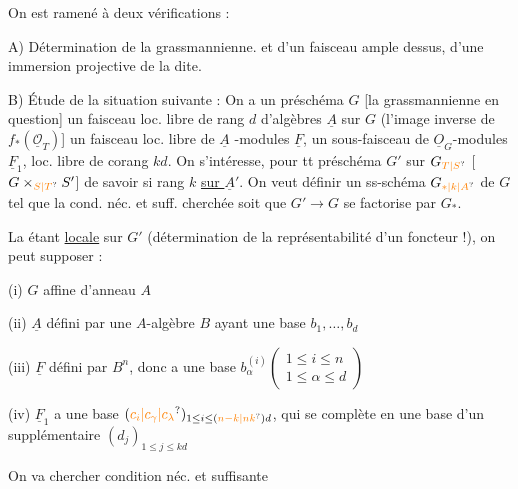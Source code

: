 

On est ramené  à deux vérifications :

A) Détermination de la grassmannienne. et d'un faisceau ample dessus,  d'une immersion projective de la dite.


B) Étude de la situation suivante : On a un préschéma $G$ [la grassmannienne en question] un faisceau loc. libre de rang $d$ d'algèbres $\underline A$ sur $G$ (l'image inverse de $f_*(\underline{\mathcal O}_T)$] un faisceau loc. libre de $\underline A$ -modules $\underline F$, un sous-faisceau de $\underline O_G$-modules $\underline F_1$,  loc. libre de corang $kd$. On s'intéresse, pour tt préschéma $G'$ sur $G_{\unsure{T|S}}$ [ $G\times_{\unsure{S|T}} S'$] de savoir si   rang $k$ \uline{sur $\underline A'$}. On veut définir un ss-schéma  $G_{\unsure{\ast|k|A}}$ de $G$ tel que la cond. néc. et suff. cherchée soit que $G'\to G$ se factorise par $G_{\ast}$.

La   étant \uline{locale} sur $G'$ (détermination de la représentabilité d'un foncteur !), on peut supposer : 

(i)  $G$ affine d'anneau $A$

(ii) $\underline A$ défini par une $A$-algèbre $B$ ayant une base $b_1,\ldots,b_d$

(iii) $\underline F$ défini par $B^n$, donc a une base $b_\alpha^{(i)}\left(\begin{smallmatrix}1\leq i\leq n\\1\leq\alpha\leq d\end{smallmatrix}\right)$

(iv) $\underline F_1$ a une base  $(\unsure{c_i|c_\gamma|c_\lambda})_{1\leq i\leq(\unsure{n-k|nk})d}$, qui se complète en une base d'un supplémentaire $(d_j)_{1\leq j\leq kd}$

On va chercher   condition néc. et suffisante

